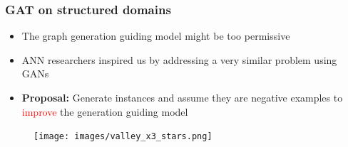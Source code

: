 \documentclass{beamer}
\newcommand{\red}[1]{\textcolor{red}{#1}}
\begin{document}
\begin{frame}
\frametitle{GAT on structured domains}
    \begin{itemize}

        \item The graph generation guiding model might be too permissive
        \item ANN researchers inspired us by addressing  a very similar problem using GANs
        
        \item {\bf Proposal:} Generate instances and assume they are negative examples
            to \red{improve} the generation guiding model
    \end{itemize}
    \begin{figure}[ht]
        \centering
        \texttt{[image: images/valley\_x3\_stars.png]}
    \end{figure}    
\end{frame}

\end{document}
